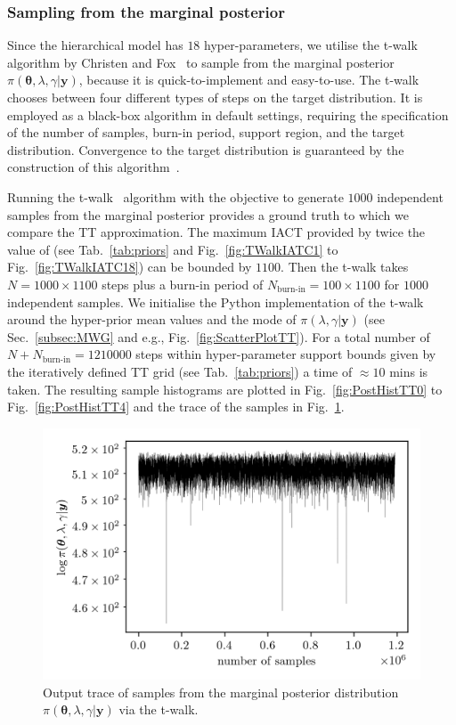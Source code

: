 \subsubsection{Sampling from the marginal posterior}
Since the hierarchical model has $18$ hyper-parameters, we utilise the t-walk algorithm by Christen and Fox~\cite{christen2010general} to sample from the marginal posterior $\pi(\bm{\theta} , \lambda, \gamma| \bm{y})$, because it is quick-to-implement and easy-to-use.
The t-walk chooses between four different types of steps on the target distribution.
It is employed as a black-box algorithm in default settings, requiring the specification of the number of samples, burn-in period, support region, and the target distribution. 
Convergence to the target distribution is guaranteed by the construction of this algorithm~\cite{christen2010general}.

Running the t-walk~\cite{christen2010general} algorithm with the objective to generate $1000$ independent samples from the marginal posterior provides a ground truth to which we compare the TT approximation.
The maximum IACT provided by twice the value of \cite{wolff2004monte, drikHesse} (see Tab.~\ref{tab:priors} and Fig.~\ref{fig:TWalkIATC1} to Fig.~\ref{fig:TWalkIATC18}) can be bounded by $1100$.
Then the t-walk takes $N = 1000 \times 1100$ steps plus a burn-in period of $N_{\text{burn-in}} = 100 \times 1100 $ for $1000$ independent samples.
We initialise the Python implementation of the t-walk~\cite{christentwalkaccess} around the hyper-prior mean values and the mode of $\pi(\lambda ,\gamma|\bm{y})$ (see Sec.~\ref{subsec:MWG} and e.g., Fig.~\ref{fig:ScatterPlotTT}).
For a total number of $N + N_{\text{burn-in}} = 1210000$ steps within hyper-parameter support bounds given by the iteratively defined TT grid (see Tab.~\ref{tab:priors}) a time of $\approx 10$ mins is taken.
The resulting sample histograms are plotted in Fig.~\ref{fig:PostHistTT0} to Fig.~\ref{fig:PostHistTT4} and the trace of the samples in Fig.~\ref{fig:TraceTwalk}.
\begin{figure}[ht!]
	\centering
	\includegraphics{TraceTwalk.png}
	\caption[T-walk trace]{Output trace of samples from the marginal posterior distribution $\pi(\bm{\theta},\lambda,\gamma|\bm{y})$ via the t-walk.}
	\label{fig:TraceTwalk}
\end{figure}
\clearpage

